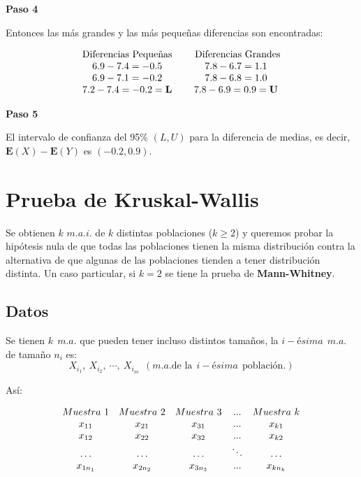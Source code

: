 \documentclass[
  a4paper,
  oneside,
  openany]{book}
\begin{document}
\textbf{Paso 4}

Entonces las más grandes y las más pequeñas diferencias son encontradas:

\[
\begin{array}{c c c c}
\mbox{Diferencias Pequeñas} & & \mbox{ Diferencias Grandes} \\
6.9 - 7.4 = -0.5 & & 7.8 - 6.7 = 1.1\\
6.9 - 7.1 = -0.2 & & 7.8 - 6.8 = 1.0\\
7.2 - 7.4 = -0.2 = \textbf{L} & & 7.8 - 6.9 = 0.9 = \textbf{U}\\
\end{array}
\]

\textbf{Paso 5}

El intervalo de confianza del 95\% \((L,U)\) para la diferencia de medias, es decir, \(\mathbf{E}(X)-\mathbf{E}(Y)\) es \((-0.2,0.9)\).

\hypertarget{prueba-de-kruskal-wallis}{%
\chapter{Prueba de Kruskal-Wallis}\label{prueba-de-kruskal-wallis}}

Se obtienen \(k\) \(m.a.i.\) de \(k\) distintas poblaciones (\(k\geq 2\)) y queremos probar la hipótesis nula de que todas las poblaciones tienen la misma distribución contra la alternativa de que algunas de las poblaciones tienden a tener distribución distinta.
Un caso particular, si \(k=2\) se tiene la prueba de \textbf{Mann-Whitney}.

\hypertarget{datos-7}{%
\section{Datos}\label{datos-7}}

Se tienen \(k\ \ m.a.\) que pueden tener incluso distintos tamaños, la \(i-ésima\ \ m.a.\) de tamaño \(n_{i}\) es:
\[X_{i_1},\ X_{i_2},\ \cdots, \ X_{i_{ni}} \ \ (m.a. \mbox{de la} \ \ i-ésima \ \ \mbox{población.})\]

Así:

\[
\begin{array}{c c c c c} 
Muestra \ 1&Muestra\ 2&Muestra\ 3&...&Muestra\ k \\
x_{11}&x_{21}&x_{31}&...&x_{k1}\\
x_{12}&x_{22}&x_{32}&...&x_{k2}\\
\ldots&\ldots&\ldots&\ddots&\ldots\\
x_{1n_1}&x_{2n_2}&x_{3n_3}&...&x_{kn_k}\\
\end{array}
\]
\end{document}
